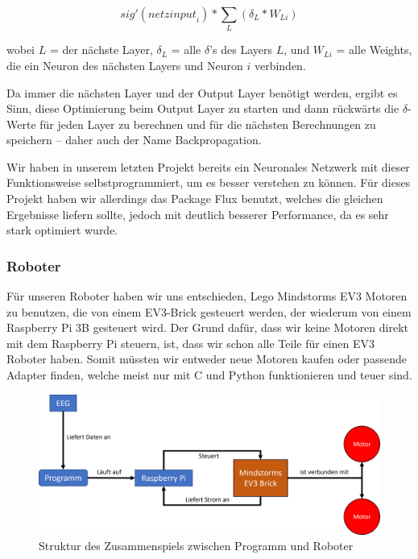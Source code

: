 \documentclass{scrartcl}
\begin{document}
	{\Large \[sig'({netzinput}_i) * \sum_{L}{\left(\delta_L\ast W_{Li}\right)}\]}
		
	\noindent wobei $L$ = der nächste Layer, $\delta_L$ = alle $\delta$'s des Layers $L$, und $W_{Li}$ = alle Weights, die ein Neuron des nächsten Layers und Neuron $i$ verbinden.


	Da immer die nächsten Layer und der Output Layer benötigt werden, ergibt es Sinn, diese Optimierung beim Output Layer zu starten und dann rückwärts die \mbox{$\delta$-Werte} für jeden Layer zu berechnen und für die nächsten Berechnungen zu speichern -- daher auch der Name Backpropagation. \cite{MITNeuronale}


	Wir haben in unserem letzten Projekt bereits ein Neuronales Netzwerk mit dieser Funktionsweise selbstprogrammiert, um es besser verstehen zu können. \cite{AIComposer} Für dieses Projekt haben wir allerdings das Package Flux benutzt, welches die gleichen Ergebnisse liefern sollte, jedoch mit deutlich besserer Performance, da es sehr stark optimiert wurde.

	\subsubsection{Roboter}

	Für unseren Roboter haben wir uns entschieden, Lego Mindstorms EV3 Motoren zu benutzen, die von einem EV3-Brick gesteuert werden, der wiederum von einem Raspberry Pi 3B gesteuert wird. Der Grund dafür, dass wir keine Motoren direkt mit dem Raspberry Pi steuern, ist, dass wir schon alle Teile für einen EV3 Roboter haben. Somit müssten wir entweder neue Motoren kaufen oder passende Adapter finden, welche meist nur mit C und Python funktionieren und teuer sind.

	\begin{figure}[h]
		\includegraphics[width=\textwidth]{pictures/roboter-funktionsweise.png}
		\caption{Struktur des Zusammenspiels zwischen Programm und Roboter}
	\end{figure}
\end{document}
